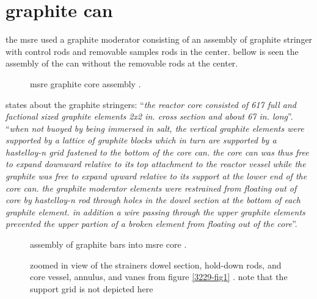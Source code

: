 \documentclass{article}
\newcommand*{\mrsarchive}{../../msr-archive}%
\begin{document}
\section{graphite can}
the msre used a graphite moderator consisting of an assembly of graphite stringer with control rods and removable samples rods in the center. bellow is seen the assembly of the can without the removable rods at the center.
\begin{figure}[H]
  \centering
  \caption{msre graphite core assembly \parencite{ornl}.}
  \label{core-assembly}
\end{figure}
\textcite[page 112 and 114]{ornl-tm-3039} states about the graphite stringers: \enquote{\textit{the reactor core consisted of 617 full and factional sized graphite elements 2x2 in. cross section and about 67 in. long}}. \enquote{\textit{when not buoyed by being immersed in salt, the vertical graphite elements were supported by a lattice of graphite blocks which in turn are supported by a hastelloy-n grid fastened to the bottom of the core can. the core can was thus free to expand downward relative to its top attachment to the reactor vessel while the graphite was free to expand upward relative to its support at the lower end of the core can. the graphite moderator elements were restrained from floating out of core by hastelloy-n rod through holes in the dowel section at the bottom of each graphite element. in addition a wire passing through the upper graphite elements prevented the upper partion of a broken element from floating out of the core}}.

\begin{figure}[H]
  \centering
  \caption{assembly of graphite bars into msre core \parencite[figure 40]{ornl-3708}.}
\end{figure}

\begin{figure}[H]
  \centering
  \caption{zoomed in view of the strainers dowel section, hold-down rods, and core vessel, annulus, and vanes from figure \ref{3229-fig1} \parencite[figure 1]{ornl-tm-3229}. note that the support grid is not depicted here}
\end{figure}
\end{document}
